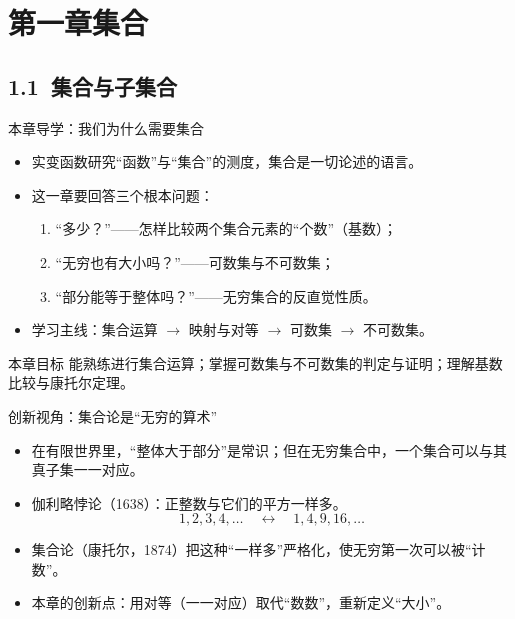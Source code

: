 \documentclass[aspectratio=169,11pt]{ctexbeamer}
\begin{document}
\section{第一章\quad 集合}

\subsection{1.1\ 集合与子集合}

\begin{frame}{本章导学：我们为什么需要集合}
  \begin{itemize}
    \item 实变函数研究“函数”与“集合”的测度，\alert{集合}是一切论述的语言。
    \item 这一章要回答三个根本问题：
      \begin{enumerate}
        \item “多少？”——怎样比较两个集合元素的“个数”（基数）；
        \item “无穷也有大小吗？”——可数集与不可数集；
        \item “部分能等于整体吗？”——无穷集合的反直觉性质。
      \end{enumerate}
    \item 学习主线：\alert{集合运算 $\to$ 映射与对等 $\to$ 可数集 $\to$ 不可数集}。
  \end{itemize}
  \begin{block}{本章目标}
    能熟练进行集合运算；掌握可数集与不可数集的判定与证明；理解基数比较与康托尔定理。
  \end{block}
\end{frame}

\begin{frame}{创新视角：集合论是“无穷的算术”}
  \begin{itemize}
    \item 在有限世界里，“整体大于部分”是常识；但在\alert{无穷集合}中，一个集合可以与其真子集一一对应。
    \item 伽利略悖论（1638）：正整数与它们的平方一样多。
      \[ 1,2,3,4,\dots \quad\leftrightarrow\quad 1,4,9,16,\dots \]
    \item 集合论（康托尔，1874）把这种“一样多”严格化，使无穷第一次可以被“计数”。
    \item 本章的创新点：用\alert{对等（一一对应）}取代“数数”，重新定义“大小”。
  \end{itemize}
\end{frame}
\end{document}
